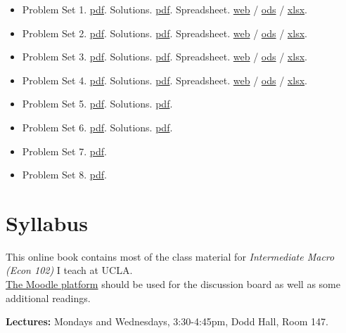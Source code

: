 \documentclass[]{book}
\providecommand{\tightlist}{%
  \setlength{\itemsep}{0pt}\setlength{\parskip}{0pt}}
\theoremstyle{definition}
\theoremstyle{definition}
\theoremstyle{definition}
\theoremstyle{remark}
\begin{document}
\begin{itemize}
\tightlist
\item
  Problem Set 1. \href{old/pset1.pdf}{pdf}. Solutions.
  \href{old/pset1-sol.pdf}{pdf}. Spreadsheet.
  \href{https://docs.google.com/spreadsheets/d/108I8xuosIQvgU6wOGrfwzHhE4p1OStgv8iIpzZ-4vME/edit?usp=sharing}{web}
  / \href{old/pset1-sol.ods}{ods} / \href{old/pset1-sol.xlsx}{xlsx}.
\item
  Problem Set 2. \href{old/pset2.pdf}{pdf}. Solutions.
  \href{old/pset2-sol.pdf}{pdf}. Spreadsheet.
  \href{https://docs.google.com/spreadsheets/d/1dkygwhDNT79cU_mTVXWal4RyGwX38OTnu5iS5UTz1fc/edit?usp=sharing}{web}
  / \href{old/pset2-sol.ods}{ods} / \href{old/pset2-sol.xlsx}{xlsx}.
\item
  Problem Set 3. \href{old/pset3.pdf}{pdf}. Solutions.
  \href{old/pset3-sol.pdf}{pdf}. Spreadsheet.
  \href{https://docs.google.com/spreadsheets/d/1dDFa5YZE5170Tv36klHQ19ykK2bP9wjeR0Y1_h-kacg/edit?usp=sharing}{web}
  / \href{old/pset3-sol.ods}{ods} / \href{old/pset3-sol.xlsx}{xlsx}.
\item
  Problem Set 4. \href{old/pset4.pdf}{pdf}. Solutions.
  \href{old/pset4-sol.pdf}{pdf}. Spreadsheet.
  \href{https://docs.google.com/spreadsheets/d/1h9JJD8K2_IE166gdj78waf0zu4YDY9Rp3r5oiJR_06s/edit?usp=sharing}{web}
  / \href{old/pset4-sol.ods}{ods} / \href{old/pset4-sol.xlsx}{xlsx}.
\item
  Problem Set 5. \href{old/pset5.pdf}{pdf}. Solutions.
  \href{old/pset5-sol.pdf}{pdf}.
\item
  Problem Set 6. \href{old/pset6.pdf}{pdf}. Solutions.
  \href{old/pset6-sol.pdf}{pdf}.
\item
  Problem Set 7. \href{old/pset7.pdf}{pdf}.
\item
  Problem Set 8. \href{old/pset8.pdf}{pdf}.
\end{itemize}

\chapter*{Syllabus}\label{syllabus}

This online book contains most of the class material for
\emph{Intermediate Macro (Econ 102)} I teach at UCLA.\\
\href{https://moodle2.sscnet.ucla.edu/course/view/18F-ECON102-1}{The
Moodle platform} should be used for the discussion board as well as some
additional readings.

\textbf{Lectures:} Mondays and Wednesdays, 3:30-4:45pm, Dodd Hall, Room
147.
\end{document}
